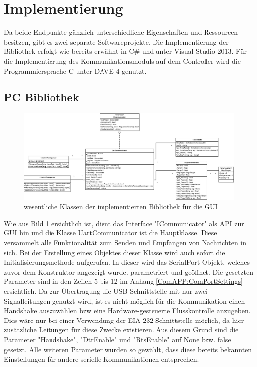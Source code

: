 \section{Implementierung}
Da beide Endpunkte gänzlich unterschiedliche Eigenschaften und Ressourcen besitzen, gibt es zwei separate Softwareprojekte. Die Implementierung der Bibliothek erfolgt wie bereits erwähnt in C\# und unter Visual Studio 2013. Für die Implementierung des Kommunikationsmoduls auf dem Controller wird die Programmiersprache C unter DAVE 4 genutzt. 
\subsection{PC Bibliothek}
\begin{figure}
  \includegraphics[width=\textwidth]{LibraryClasses}
  \caption{wesentliche Klassen der implementierten Bibliothek für die GUI}
  \label{fig:guiclasses}
\end{figure}
Wie aus Bild \ref{fig:guiclasses} ersichtlich ist, dient das Interface "ICommunicator" als API zur GUI hin und die Klasse UartCommunicator ist die Hauptklasse. Diese versammelt alle Funktionalität zum Senden und Empfangen von Nachrichten in sich. Bei der Erstellung eines Objektes dieser Klasse wird auch sofort die Initialisierungsmethode aufgerufen. In dieser wird das SerialPort-Objekt, welches zuvor dem Konstruktor angezeigt wurde, parametriert und geöffnet. Die gesetzten Parameter sind in den Zeilen 5 bis 12 im Anhang \ref{ComAPP:ComPortSettings} ersichtlich. Da zur Übertragung die USB-Schnittstelle mit nur zwei Signalleitungen genutzt wird, ist es nicht möglich für die Kommunikation einen Handshake auszuwählen bzw eine Hardware-gesteuerte Flusskontrolle anzugeben. Dies wäre nur bei einer Verwendung der EIA-232 Schnittstelle möglich, da hier zusätzliche Leitungen für diese Zwecke existieren. Aus diesem Grund sind die Parameter "Handshake", "DtrEnable" und "RtsEnable" auf None bzw. false gesetzt. Alle weiteren Parameter wurden so gewählt, dass diese bereits bekannten Einstellungen für andere serielle Kommunikationen entsprechen.
